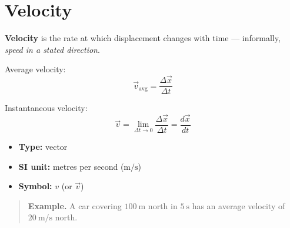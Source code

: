 
\section*{Velocity}

\textbf{Velocity} is the rate at which displacement changes with time ---
informally, \emph{speed in a stated direction}.

Average velocity:
\begin{equation}
  \vec{v}_{\text{avg}} = \frac{\Delta \vec{x}}{\Delta t}
\end{equation}

Instantaneous velocity:
\begin{equation}
  \vec{v} = \lim_{\Delta t \to 0}\frac{\Delta \vec{x}}{\Delta t}
          = \frac{d\vec{x}}{dt}
\end{equation}

\begin{itemize}
  \item \textbf{Type:} vector
  \item \textbf{SI unit:} metres per second ($\text{m/s}$)
  \item \textbf{Symbol:} $v$ (or $\vec{v}$)
\end{itemize}

\begin{quote}
\textbf{Example.} A car covering $100\ \text{m}$ north in $5\ \text{s}$
has an average velocity of $20\ \text{m/s}$ north.
\end{quote}
